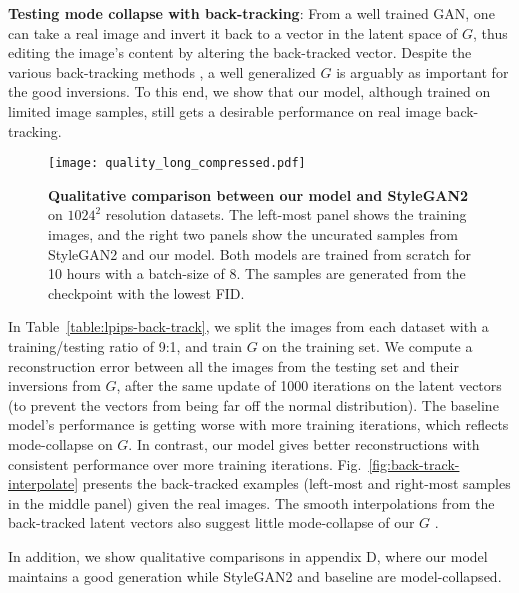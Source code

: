 \documentclass{article} \usepackage{iclr2021_conference,times}
\begin{document}
\textbf{Testing mode collapse with back-tracking}: From a well trained GAN, one can take a real image and invert it back to a vector in the latent space of $ G $, thus editing the image's content by altering the back-tracked vector. Despite the various back-tracking methods \citep{zhu2016generative,lipton2017precise,zhu2020domain,abdal2019image2stylegan}, a well generalized $G$ is arguably as important for the good inversions. 
To this end, we show that our model, although trained on limited image samples, still gets a desirable performance on real image back-tracking.

\begin{figure}
\begin{center}
\texttt{[image: quality\_long\_compressed.pdf]}
\end{center}
\caption{\textbf{Qualitative comparison between our model and StyleGAN2} on $1024^2$ resolution datasets. The left-most panel shows the training images, and the right two panels show the uncurated samples from StyleGAN2 and our model. Both models are trained from scratch for 10 hours with a batch-size of 8. The samples are generated from the checkpoint with the lowest FID. }
\label{fig:quality-compare}
\end{figure}

In Table~\ref{table:lpips-back-track}, we split the images from each dataset with a training/testing ratio of 9:1, and train $G$ on the training set. We compute a reconstruction error between all the images from the testing set and their inversions from $G$, after the same update of 1000 iterations on the latent vectors (to prevent the vectors from being far off the normal distribution). The baseline model's performance is getting worse with more training iterations, which reflects mode-collapse on $ G $. In contrast, our model gives better reconstructions with consistent performance over more training iterations. Fig.~\ref{fig:back-track-interpolate} presents the back-tracked examples (left-most and right-most samples in the middle panel) given the real images. The smooth interpolations from the back-tracked latent vectors also suggest little mode-collapse of our $G$ \citep{radford2015unsupervised,zhao2020differentiable,robb2020few}.

In addition, we show qualitative comparisons in appendix D, where our model maintains a good generation while StyleGAN2 and baseline are model-collapsed.
\end{document}
